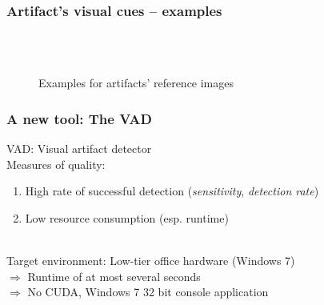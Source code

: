 \documentclass[xcolor=dvipsnames]{beamer}
\begin{document}
	\begin{frame}
		\frametitle{Artifact's visual cues -- examples}
		\begin{figure}[h!]
			\qquad
			\\
			\qquad
			\\
			\caption{Examples for artifacts' reference images}\label{fig:artifact-examples}
		\end{figure}
	\end{frame}
	
	\begin{frame}
		\frametitle{A new tool: The VAD}
		VAD: Visual artifact detector\\
		Measures of quality:
		\begin{enumerate}
			\item High rate of successful detection (\emph{sensitivity}, \emph{detection rate})
			\item Low resource consumption (esp. runtime)
		\end{enumerate}
		\pause
		\vspace*{1cm}~\\
		Target environment: Low-tier office hardware (Windows 7)\\
		$\Rightarrow$ Runtime of at most several seconds\\
		$\Rightarrow$ No CUDA, Windows 7 32 bit console application
	\end{frame}
	
\end{document}
